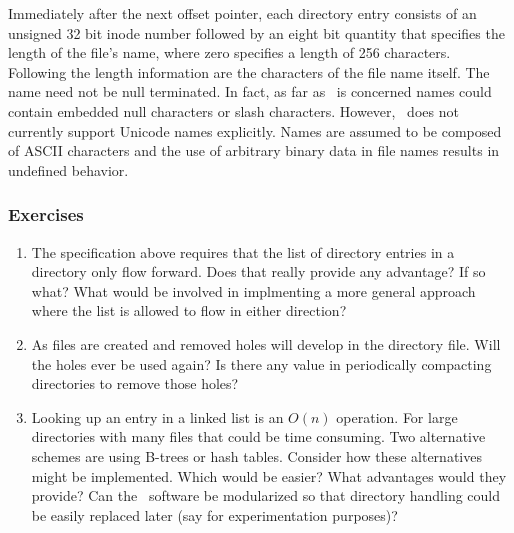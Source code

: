 Immediately after the next offset pointer, each directory entry consists of an unsigned 32 bit
inode number followed by an eight bit quantity that specifies the length of the file's name,
where zero specifies a length of 256 characters. Following the length information are the
characters of the file name itself. The name need not be null terminated. In fact, as far as
\GenericFS\ is concerned names could contain embedded null characters or slash characters.
However, \GenericFS\ does not currently support Unicode names explicitly. Names are assumed to
be composed of ASCII characters and the use of arbitrary binary data in file names results in
undefined behavior.

\subsubsection*{Exercises}

\begin{enumerate}

\item The specification above requires that the list of directory entries in a directory only
  flow forward. Does that really provide any advantage? If so what? What would be involved in
  implmenting a more general approach where the list is allowed to flow in either direction?

\item As files are created and removed holes will develop in the directory file. Will the holes
  ever be used again? Is there any value in periodically compacting directories to remove those
  holes?

\item Looking up an entry in a linked list is an $O(n)$ operation. For large directories with
  many files that could be time consuming. Two alternative schemes are using B-trees or hash
  tables. Consider how these alternatives might be implemented. Which would be easier? What
  advantages would they provide? Can the \GenericFS\ software be modularized so that directory
  handling could be easily replaced later (say for experimentation purposes)?

\end{enumerate}
